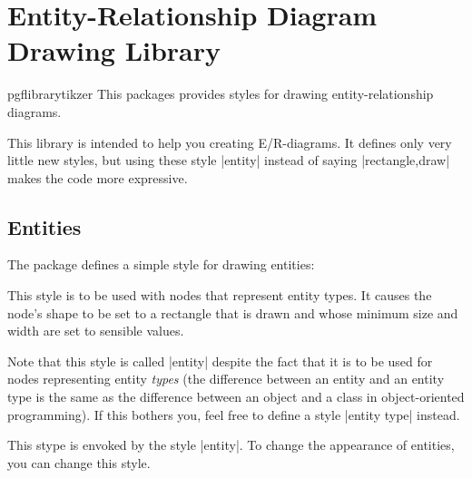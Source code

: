 %



\section{Entity-Relationship Diagram Drawing Library}

\begin{package}{pgflibrarytikzer}
  This packages provides styles for drawing entity-relationship
  diagrams. 
\end{package}

This library is intended to help you creating E/R-diagrams. It defines
only very little new styles, but using these style |entity| instead of
saying |rectangle,draw| makes the code more expressive.


\subsection{Entities}

The package defines a simple style for drawing entities:

\begin{itemize}
  This style is to be used with nodes that represent entity types. It
  causes the node's shape to be set to a rectangle that is drawn and
  whose minimum size and width are set to sensible values.

  Note that this style is called |entity| despite the fact that it is
  to be used for nodes representing entity \emph{types} (the
  difference between an entity and an entity type is the same as the
  difference between an object and a class in object-oriented
  programming). If this bothers you, feel free to define a style
  |entity type| instead.
\begin{codeexample}[]
\end{codeexample}
  
  This stype is envoked by the style |entity|. To change the
  appearance of entities, you can change this style.
\begin{codeexample}[]
\end{codeexample}
\end{itemize}



